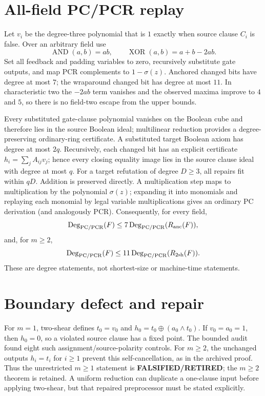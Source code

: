 \documentclass[11pt]{article}
\newcommand{\status}[1]{\textbf{#1}}
\begin{document}
\section*{All-field PC/PCR replay}
Let $v_i$ be the degree-three polynomial that is $1$ exactly when source clause $C_i$ is false.  Over an arbitrary field use
\[
\operatorname{AND}(a,b)=ab,\qquad
\operatorname{XOR}(a,b)=a+b-2ab.
\]
Set all feedback and padding variables to zero, recursively substitute gate outputs, and map PCR complements to $1-\sigma(z)$.  Anchored changed bits have degree at most $7$; the wraparound changed bit has degree at most $11$.  In characteristic two the $-2ab$ term vanishes and the observed maxima improve to $4$ and $5$, so there is no field-two escape from the upper bounds.

Every substituted gate-clause polynomial vanishes on the Boolean cube and therefore lies in the source Boolean ideal; multilinear reduction provides a degree-preserving ordinary-ring certificate.  A substituted target Boolean axiom has degree at most $2q$.  Recursively, each changed bit has an explicit certificate $h_i=\sum_j A_{ij}v_j$; hence every closing equality image lies in the source clause ideal with degree at most $q$.  For a target refutation of degree $D\geq3$, all repairs fit within $qD$.  Addition is preserved directly.  A multiplication step maps to multiplication by the polynomial $\sigma(z)$; expanding it into monomials and replaying each monomial by legal variable multiplications gives an ordinary PC derivation (and analogously PCR).  Consequently, for every field,
\[
 \operatorname{Deg}_{\rm PC/PCR}(F)\leq
 7\operatorname{Deg}_{\rm PC/PCR}(R_{\rm anc}(F)),
\]
and, for $m\geq2$,
\[
 \operatorname{Deg}_{\rm PC/PCR}(F)\leq
 11\operatorname{Deg}_{\rm PC/PCR}(R_{\rm 2sh}(F)).
\]
These are degree statements, not shortest-size or machine-time statements.

\section*{Boundary defect and repair}
For $m=1$, two-shear defines $t_0=v_0$ and $h_0=t_0\oplus(a_0\wedge t_0)$.  If $v_0=a_0=1$, then $h_0=0$, so a violated source clause has a fixed point.  The bounded audit found eight such assignment/source-polarity controls.  For $m\geq2$, the unchanged outputs $h_i=t_i$ for $i\geq1$ prevent this self-cancellation, as in the archived proof.  Thus the unrestricted $m\geq1$ statement is \status{FALSIFIED/RETIRED}; the $m\geq2$ theorem is retained.  A uniform reduction can duplicate a one-clause input before applying two-shear, but that repaired preprocessor must be stated explicitly.
\end{document}
